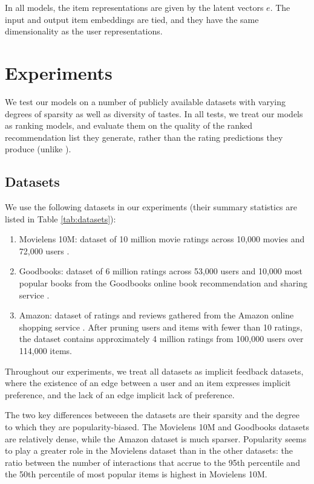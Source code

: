 \documentclass[sigchi]{acmart}
\begin{document}
In all models, the item representations are given by the latent vectors $e$. The input and output item embeddings are tied, and they have the same dimensionality as the user representations.

\section{Experiments}
We test our models on a number of publicly available datasets with varying degrees of sparsity as well as diversity of tastes. In all tests, we treat our models as ranking models, and evaluate them on the quality of the ranked recommendation list they generate, rather than the rating predictions they produce (unlike \citep{wu2017recurrent}).


\subsection{Datasets}
We use the following datasets in our experiments (their summary statistics are listed in Table \ref{tab:datasets}):

\begin{enumerate}
\item Movielens 10M: dataset of 10 million movie ratings across 10,000 movies and 72,000 users \citep{harper2016movielens}.
\item Goodbooks: dataset of 6 million ratings across 53,000 users and 10,000 most popular books from the Goodbooks online book recommendation and sharing service \citep{goodbooks2017}.
\item Amazon: dataset of ratings and reviews gathered from the Amazon online shopping service \citep{leskovec2007dynamics}. After pruning users and items with fewer than 10 ratings, the dataset contains approximately 4 million ratings from 100,000 users over 114,000 items.
\end{enumerate}
Throughout our experiments, we treat all datasets as implicit feedback datasets, where the existence of an edge between a user and an item expresses implicit preference, and the lack of an edge implicit lack of preference.

The two key differences betweeen the datasets are their sparsity and the degree to which they are popularity-biased. The Movielens 10M and Goodbooks datasets are relatively dense, while the Amazon dataset is much sparser. Popularity seems to play a greater role in the Movielens dataset than in the other datasets: the ratio between the number of interactions that accrue to the 95th percentile and the 50th percentile of most popular items is highest in Movielens 10M.
\end{document}
